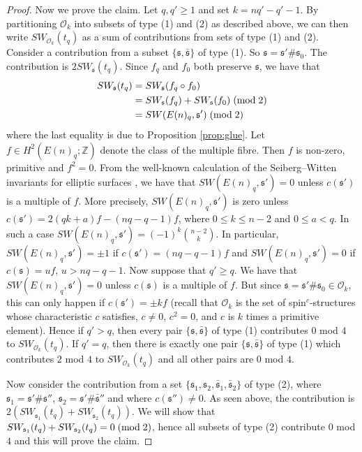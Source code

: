 \documentclass{amsart}
\theoremstyle{definition}
\theoremstyle{remark}
\numberwithin{equation}{section}
\begin{document}
\begin{proof}
Now we prove the claim. Let $q,q' \ge 1$ and set $k = nq'-q'-1$. By partitioning $\mathcal{O}_k$ into subsets of type (1) and (2) as described above, we can then write $SW_{\mathcal{O}_k}(t_{q})$ as a sum of contributions from sets of type (1) and (2). Consider a contribution from a subset $\{ \mathfrak{s} , \bar{\mathfrak{s}} \}$ of type (1). So $\mathfrak{s} = \mathfrak{s}' \# \mathfrak{s}_0$. The contribution is $2 SW_{\mathfrak{s}}( t_q )$. Since $f_q$ and $f_0$ both preserve $\mathfrak{s}$, we have that
\begin{align*}
SW_{\mathfrak{s}}(t_q) &= SW_{\mathfrak{s}}( f_q \circ f_0 ) \\
&= SW_{\mathfrak{s}}( f_q ) + SW_{\mathfrak{s}}( f_0) \; ({\rm mod} \; 2) \\
&= SW( E(n)_q , \mathfrak{s}' ) \; ({\rm mod} \; 2)
\end{align*}
where the last equality is due to Proposition \ref{prop:glue}. Let $f \in H^2( E(n)_q ; \mathbb{Z})$ denote the class of the multiple fibre. Then $f$ is non-zero, primitive and $f^2 = 0$. From the well-known calculation of the Seiberg--Witten invariants for elliptic surfaces \cite[Chapter 3]{nic}, we have that $SW( E(n)_q , \mathfrak{s}' ) = 0$ unless $c(\mathfrak{s}')$ is a multiple of $f$. More precisely, $SW(E(n)_q , \mathfrak{s}')$ is zero unless $c(\mathfrak{s}') = 2( qk + a)f - (nq-q-1)f$, where $0 \le k \le n-2$ and $0 \le a < q$. In such a case $SW(E(n)_q , \mathfrak{s}') = (-1)^k \binom{ n-2}{ k }$. In particular, $SW( E(n)_q , \mathfrak{s}') = \pm 1$ if $c(\mathfrak{s}') = (nq-q-1)f$ and $SW(E(n)_q , \mathfrak{s}') = 0$ if $c(\mathfrak{s}) = u f$, $u > nq-q-1$. Now suppose that $q' \ge q$. We have that $SW(E(n)_q , \mathfrak{s}') = 0$ unless $c(\mathfrak{s})$ is a multiple of $f$. But since $\mathfrak{s} = \mathfrak{s}' \# \mathfrak{s}_0 \in \mathcal{O}_k$, this can only happen if $c(\mathfrak{s}') = \pm k f$ (recall that $\mathcal{O}_k$ is the set of spin$^c$-structures whose characteristic $c$ satisfies, $c \neq 0$, $c^2 = 0$, and $c$ is $k$ times a primitive element). Hence if $q' > q$, then every pair $\{ \mathfrak{s} , \bar{\mathfrak{s}} \}$ of type (1) contributes $0$ mod $4$ to $SW_{\mathcal{O}_k}(t_q)$. If $q' = q$, then there is exactly one pair $\{ \mathfrak{s} , \bar{\mathfrak{s}} \}$ of type (1) which contributes $2$ mod $4$ to $SW_{\mathcal{O}_k}(t_q)$ and all other pairs are $0$ mod $4$.

Now consider the contribution from a set $\{ \mathfrak{s}_1 , \mathfrak{s}_2 , \bar{\mathfrak{s}}_1 , \bar{\mathfrak{s}}_2 \}$ of type (2), where $\mathfrak{s}_1 = \mathfrak{s}' \# \mathfrak{s}''$, $\mathfrak{s}_2 = \mathfrak{s}' \# \bar{\mathfrak{s}}''$ and where $c(\mathfrak{s}'') \neq 0$. As seen above, the contribution is $2 ( SW_{\mathfrak{s}_1}(t_q) + SW_{\mathfrak{s}_2}(t_q) )$. We will show that $SW_{\mathfrak{s}_1}(t_q) + SW_{\mathfrak{s}_2}(t_q) = 0 \; ({\rm mod} \; 2)$, hence all subsets of type (2) contribute $0$ mod $4$ and this will prove the claim.


\end{proof}
\end{document}
